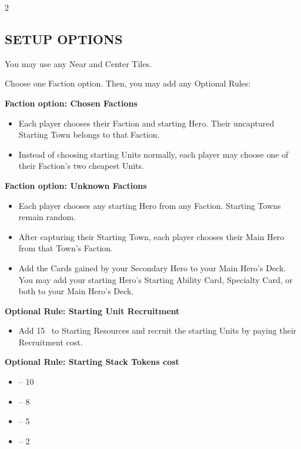 \begin{multicols}{2}

\subsection*{\MakeUppercase{Setup options}}

You may use any Near and Center Tiles.

Choose one Faction option. Then, you may add any Optional Rules:

\textbf{Faction option: Chosen Factions}
\begin{itemize}
  \item Each player chooses their Faction and starting Hero. Their uncaptured Starting Town belongs to that Faction.
  \item Instead of choosing starting  Units normally, each player may choose one of their Faction's two cheapest  Units.
\end{itemize}

\textbf{Faction option: Unknown Factions}
\begin{itemize}
  \item Each player chooses any starting Hero from any Faction. Starting Towns remain random.
  \item After capturing their Starting Town, each player chooses their Main Hero from that Town's Faction.
  \item Add the Cards gained by your Secondary Hero to your Main Hero's Deck. You may add your starting Hero's Starting Ability Card, Specialty Card, or both to your Main Hero's Deck.
\end{itemize}

\textbf{Optional Rule: Starting Unit Recruitment}
\begin{itemize}
  \item Add 15~ to Starting Resources and recruit the starting Units by paying their Recruitment  cost.
\end{itemize}

\textbf{Optional Rule: Starting Stack Tokens cost}
\begin{itemize}
  \item {} -- 10~
  \item {} -- 8~
  \item {} -- 5~
  \item {} -- 2~
\end{itemize}


\end{multicols}
